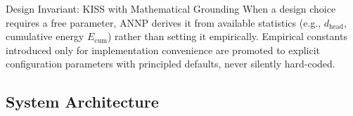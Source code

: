 \documentclass[11pt,a4paper]{article}
\theoremstyle{definition}
\begin{document}
\begin{designbox}{Design Invariant: KISS with Mathematical Grounding}
  When a design choice requires a free parameter, ANNP derives it from available statistics
  (e.g., $d_{\text{head}}$, cumulative energy $E_\text{cum}$) rather than setting it empirically.
  Empirical constants introduced only for implementation convenience are promoted to explicit
  configuration parameters with principled defaults, never silently hard-coded.
\end{designbox}

\subsection{System Architecture}
\label{sec:architecture}
\end{document}
